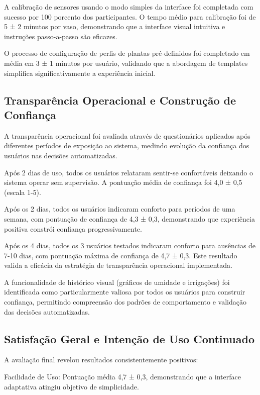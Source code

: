 A calibração de sensores usando o modo simples da interface foi completada com sucesso por 100 porcento dos participantes. O tempo médio para calibração foi de 5 ± 2 minutos por vaso, demonstrando que a interface visual intuitiva e instruções passo-a-passo são eficazes.

O processo de configuração de perfis de plantas pré-definidos foi completado em média em 3 ± 1 minutos por usuário, validando que a abordagem de templates simplifica significativamente a experiência inicial.

\subsection{Transparência Operacional e Construção de Confiança}

A transparência operacional foi avaliada através de questionários aplicados após diferentes períodos de exposição ao sistema, medindo evolução da confiança dos usuários nas decisões automatizadas.

Após 2 dias de uso, todos os usuários relataram sentir-se confortáveis deixando o sistema operar sem supervisão. A pontuação média de confiança foi 4,0 ± 0,5 (escala 1-5).

Após os 2 dias, todos os usuários indicaram conforto para períodos de uma semana, com pontuação de confiança de 4,3 ± 0,3, demonstrando que experiência positiva constrói confiança progressivamente.

Após os 4 dias, todos os 3 usuários testados indicaram conforto para ausências de 7-10 dias, com pontuação máxima de confiança de 4,7 ± 0,3. Este resultado valida a eficácia da estratégia de transparência operacional implementada.

A funcionalidade de histórico visual (gráficos de umidade e irrigações) foi identificada como particularmente valiosa por todos os usuários para construir confiança, permitindo compreensão dos padrões de comportamento e validação das decisões automatizadas.

\subsection{Satisfação Geral e Intenção de Uso Continuado}

A avaliação final revelou resultados consistentemente positivos:

Facilidade de Uso: Pontuação média 4,7 ± 0,3, demonstrando que a interface adaptativa atingiu objetivo de simplicidade.

